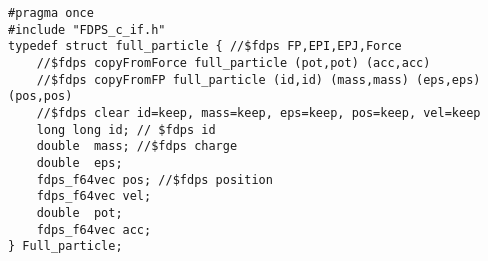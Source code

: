\documentclass[10pt,twocolumn,a4paper,fleqn]{article}
\begin{document}

\begin{mdframed}[
    backgroundcolor=bg,
    topline=false,
    bottomline=false,
    leftline=false,
    rightline=false]
\begin{verbatim}
#pragma once
#include "FDPS_c_if.h"
typedef struct full_particle { //$fdps FP,EPI,EPJ,Force
    //$fdps copyFromForce full_particle (pot,pot) (acc,acc)
    //$fdps copyFromFP full_particle (id,id) (mass,mass) (eps,eps) (pos,pos) 
    //$fdps clear id=keep, mass=keep, eps=keep, pos=keep, vel=keep
    long long id; // $fdps id
    double  mass; //$fdps charge
    double  eps;
    fdps_f64vec pos; //$fdps position
    fdps_f64vec vel;
    double  pot;
    fdps_f64vec acc;
} Full_particle;
\end{verbatim}
\end{mdframed}



\end{document}
